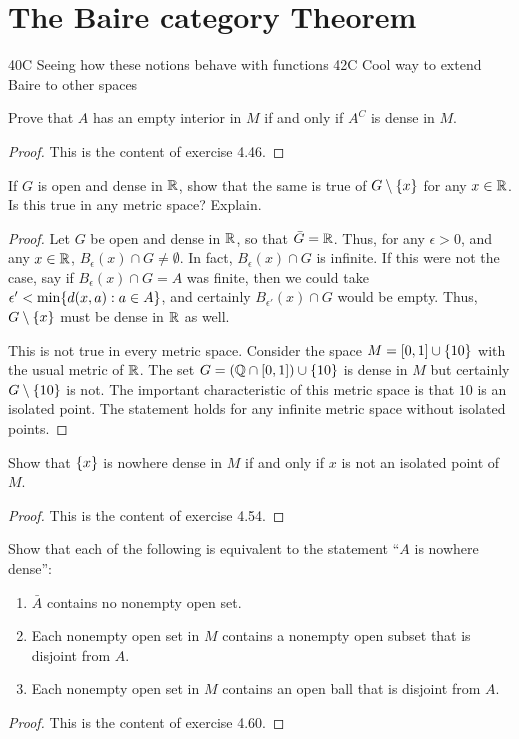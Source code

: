 \section{The Baire category Theorem}


40C Seeing how these notions behave with functions 
42C Cool way to extend Baire to other spaces 

\begin{exercise}{14}
Prove that $A$ has an empty interior in $M$ if and only if $A^C$ is dense in $M$.
\end{exercise}
\begin{proof}
This is the content of exercise 4.46.
\end{proof} 

\begin{exercise}{15}
If $G$ is open and dense in $\mathbb{R}$, show that the same is true of $G\setminus\{x\}$ for any $x\in\mathbb{R}$. 
Is this true in any metric space?
Explain.
\end{exercise}
\begin{proof}
Let $G$ be open and dense in $\mathbb{R}$, so that $\bar{G}=\mathbb{R}$.
Thus, for any $\epsilon>0$, and any $x\in\mathbb{R}$, $B_\epsilon(x)\cap G\neq \emptyset$.
In fact, $B_\epsilon(x)\cap G$ is infinite.
If this were not the case, say if $B_\epsilon(x)\cap G = A$ was finite, then we could take $\epsilon' < \min\{d(x,a): a\in A\}$, and certainly $B_{\epsilon'}(x)\cap G$ would be empty. 
Thus, $G\setminus\{x\}$ must be dense in $\mathbb{R}$ as well.

This is not true in every metric space.
Consider the space $M=[0,1]\cup \{10\}$ with the usual metric of $\mathbb{R}$.
The set $G = (\mathbb{Q}\cap[0,1]) \cup \{10\}$ is dense in $M$ but certainly $G\setminus\{10\}$ is not.
The important characteristic of this metric space is that $10$ is an isolated point.
The statement holds for any infinite metric space without isolated points.
\end{proof} 

\begin{exercise}{16}
Show that $\{x\}$ is nowhere dense in $M$ if and only if $x$ is not an isolated point of $M$.
\end{exercise}
\begin{proof}
This is the content of exercise 4.54.
\end{proof} 

\begin{exercise}{19}
Show that each of the following is equivalent to the statement ``$A$ is nowhere dense'':
\begin{enumerate}
    \item $\bar{A}$ contains no nonempty open set.
    \item Each nonempty open set in $M$ contains a nonempty open subset that is disjoint from $A$.
    \item Each nonempty open set in $M$ contains an open ball that is disjoint from $A$.
\end{enumerate}
\end{exercise}
\begin{proof}
This is the content of exercise 4.60.
\end{proof} 

